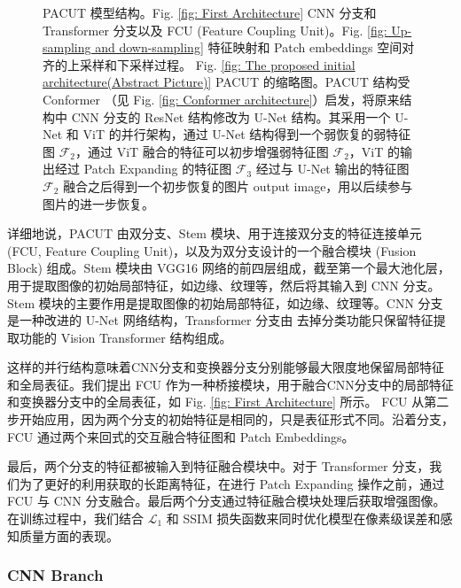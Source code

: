 \documentclass[a4paper, 10pt]{article}
\begin{document}
\begin{figure}[htb]
			\captionsetup{font=scriptsize}
			\caption{
				\label{fig: PACUT}
				PACUT 模型结构。Fig. \ref{fig: First Architecture} CNN 分支和 Transformer 分支以及 FCU (Feature Coupling Unit)。Fig. \ref{fig: Up-sampling and down-sampling} 特征映射和 Patch embeddings 空间对齐的上采样和下采样过程。 Fig. \ref{fig: The proposed initial architecture(Abstract Picture)} PACUT 的缩略图。PACUT 结构受 Conformer\cite{peng2021conformer} （见 Fig. \ref{fig: Conformer architecture}）启发，将原来结构中 CNN 分支的 ResNet 结构修改为 U-Net 结构。其采用一个 U-Net 和 ViT 的并行架构，通过 U-Net 结构得到一个弱恢复的弱特征图 $\mathcal{F}_2$，通过 ViT 融合的特征可以初步增强弱特征图 $\mathcal{F}_2$，ViT 的输出经过 Patch Expanding 的特征图 $\mathcal{F}_3$ 经过与 U-Net 输出的特征图 $\mathcal{F}_2$ 融合之后得到一个初步恢复的图片 output image，用以后续参与图片的进一步恢复。
			}
		\end{figure}
		
		详细地说，PACUT 由双分支、Stem 模块、用于连接双分支的特征连接单元 (FCU, Feature Coupling Unit)，以及为双分支设计的一个融合模块 (Fusion Block) 组成。Stem 模块由 VGG16 网络的前四层组成，截至第一个最大池化层，用于提取图像的初始局部特征，如边缘、纹理等，然后将其输入到 CNN 分支。
		Stem 模块的主要作用是提取图像的初始局部特征，如边缘、纹理等。CNN 分支是一种改进的 U-Net 网络结构，Transformer 分支由 去掉分类功能只保留特征提取功能的 Vision Transformer 结构组成。 
		
		这样的并行结构意味着CNN分支和变换器分支分别能够最大限度地保留局部特征和全局表征。我们提出 FCU 作为一种桥接模块，用于融合CNN分支中的局部特征和变换器分支中的全局表征，如 Fig. \ref{fig: First Architecture} 所示。 FCU 从第二步开始应用，因为两个分支的初始特征是相同的，只是表征形式不同。沿着分支，FCU 通过两个来回式的交互融合特征图和 Patch Embeddings。
		
		最后，两个分支的特征都被输入到特征融合模块中。对于 Transformer 分支，我们为了更好的利用获取的长距离特征，在进行 Patch Expanding 操作之前，通过 FCU 与 CNN 分支融合。最后两个分支通过特征融合模块处理后获取增强图像。在训练过程中，我们结合 $\mathcal{L}_1$ 和 SSIM 损失函数来同时优化模型在像素级误差和感知质量方面的表现。

		
		\subsubsection{CNN Branch}	
			
\end{document}
